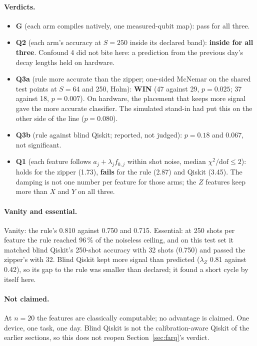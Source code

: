 \documentclass[11pt]{article}
\begin{document}
\paragraph{Verdicts.}
\begin{itemize}
\item \textbf{G} (each arm compiles natively, one measured-qubit map): pass for all three.
\item \textbf{Q2} (each arm's accuracy at $S = 250$ inside its declared band): \textbf{inside for all three}. Confound 4
  did not bite here: a prediction from the previous day's decay lengths held on hardware.
\item \textbf{Q3a} (rule more accurate than the zipper; one-sided McNemar on the shared test points at $S = 64$ and 250,
  Holm): \textbf{WIN} (47 against 29, $p = 0.025$; 37 against 18, $p = 0.007$). On hardware, the placement that keeps
  more signal gave the more accurate classifier. The simulated stand-in had put this on the other side of the line
  ($p = 0.080$).
\item \textbf{Q3b} (rule against blind Qiskit; reported, not judged): $p = 0.18$ and $0.067$, not significant.
\item \textbf{Q1} (each feature follows $a_j + \lambda_j f_{0,j}$ within shot noise, median $\chi^2/\mathrm{dof} \le 2$):
  holds for the zipper (1.73), \textbf{fails} for the rule (2.87) and Qiskit (3.45). The damping is not one number per
  feature for those arms; the $Z$ features keep more than $X$ and $Y$ on all three.
\end{itemize}

\paragraph{Vanity and essential.} Vanity: the rule's 0.810 against 0.750 and 0.715. Essential: at 250 shots per
feature the rule reached 96\,\% of the noiseless ceiling, and on this test set it matched blind Qiskit's 250-shot
accuracy with 32 shots (0.750) and passed the zipper's with 32. Blind Qiskit kept more signal than predicted ($\lambda_Z$
0.81 against 0.42), so its gap to the rule was smaller than declared; it found a short cycle by itself here.

\paragraph{Not claimed.} At $n = 20$ the features are classically computable; no advantage is claimed. One device,
one task, one day. Blind Qiskit is not the calibration-aware Qiskit of the earlier sections, so this does not reopen
Section~\ref{sec:farq}'s verdict.
\end{document}
